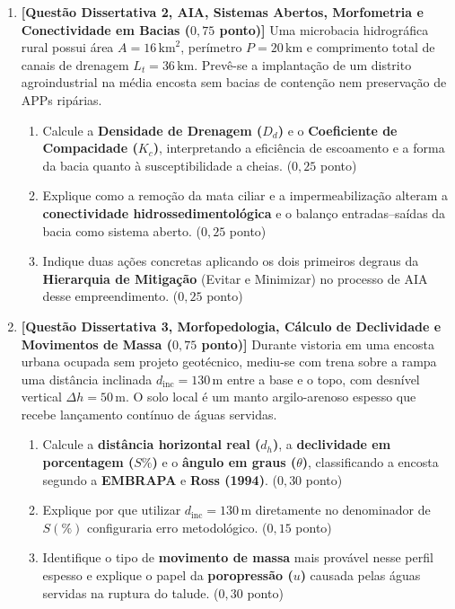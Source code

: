 \begin{enumerate}[leftmargin=1.8em, itemsep=6pt, resume]
  \item \textbf{[Questão Dissertativa 2, AIA, Sistemas Abertos, Morfometria e Conectividade em Bacias ($0{,}75$ ponto)]}
  Uma microbacia hidrográfica rural possui área $A = 16\,\text{km}^2$, perímetro $P = 20\,\text{km}$ e comprimento total de canais de drenagem $L_t = 36\,\text{km}$. Prevê-se a implantação de um distrito agroindustrial na média encosta sem bacias de contenção nem preservação de APPs ripárias.
  \begin{enumerate}[label=(\alph*), leftmargin=1.8em, itemsep=2pt]
    \item Calcule a \textbf{Densidade de Drenagem ($D_d$)} e o \textbf{Coeficiente de Compacidade ($K_c$)}, interpretando a eficiência de escoamento e a forma da bacia quanto à susceptibilidade a cheias. ($0{,}25$ ponto)
    \item Explique como a remoção da mata ciliar e a impermeabilização alteram a \textbf{conectividade hidrossedimentológica} e o balanço entradas--saídas da bacia como sistema aberto. ($0{,}25$ ponto)
    \item Indique duas ações concretas aplicando os dois primeiros degraus da \textbf{Hierarquia de Mitigação} (Evitar e Minimizar) no processo de AIA desse empreendimento. ($0{,}25$ ponto)
  \end{enumerate}
  \espacoResolucao[3.8cm]

  \item \textbf{[Questão Dissertativa 3, Morfopedologia, Cálculo de Declividade e Movimentos de Massa ($0{,}75$ ponto)]}
  Durante vistoria em uma encosta urbana ocupada sem projeto geotécnico, mediu-se com trena sobre a rampa uma distância inclinada $d_{\text{inc}} = 130\,\text{m}$ entre a base e o topo, com desnível vertical $\Delta h = 50\,\text{m}$. O solo local é um manto argilo-arenoso espesso que recebe lançamento contínuo de águas servidas.
  \begin{enumerate}[label=(\alph*), leftmargin=1.8em, itemsep=2pt]
    \item Calcule a \textbf{distância horizontal real ($d_h$)}, a \textbf{declividade em porcentagem ($S\%$)} e o \textbf{ângulo em graus ($\theta$)}, classificando a encosta segundo a \textbf{EMBRAPA} e \textbf{Ross (1994)}. ($0{,}30$ ponto)
    \item Explique por que utilizar $d_{\text{inc}} = 130\,\text{m}$ diretamente no denominador de $S(\%)$ configuraria erro metodológico. ($0{,}15$ ponto)
    \item Identifique o tipo de \textbf{movimento de massa} mais provável nesse perfil espesso e explique o papel da \textbf{poropressão ($u$)} causada pelas águas servidas na ruptura do talude. ($0{,}30$ ponto)
  \end{enumerate}
  \espacoResolucao[3.8cm]


\end{enumerate}
